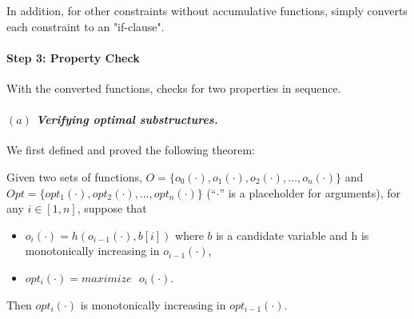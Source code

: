 In addition, for other constraints without accumulative functions, \tool simply converts each constraint to an "if-clause".




\paragraph{Step 3: Property Check}
With the converted functions, \tool checks for two properties in sequence. 

\paragraph{$(a)$ \emph{Verifying optimal substructures.}}
We first defined and proved the following theorem:

\begin{theorem}
\label{thm1}
Given two sets of functions, $O=\{o_0(\cdot), o_1(\cdot), o_2(\cdot),  \ldots, o_n(\cdot)\}$ and  $Opt=\{opt_1(\cdot), opt_2(\cdot), \ldots, opt_n(\cdot)\}$ (``$\cdot$'' is a placeholder for arguments), for any $i\in[1, n]$, suppose that
\begin{itemize}
    \item $o_i(\cdot)=h(o_{i-1}(\cdot), b[i])$ where $b$ is a candidate variable and h is monotonically increasing in $o_{i-1}(\cdot)$,  
    \item $opt_i(\cdot)=maximize\text{ }o_i(\cdot)$. 
\end{itemize}
Then $opt_i(\cdot)$ is monotonically increasing in $opt_{i-1}(\cdot)$. 
\end{theorem}

